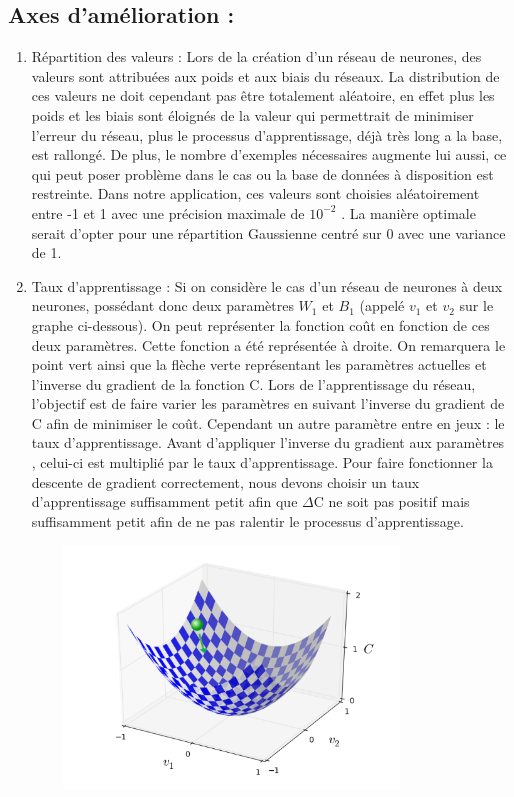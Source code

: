\documentclass{article}
\begin{document}
\subsection{Axes d'amélioration :}
	\begin{enumerate}
			\item Répartition des valeurs :
			Lors de la création d'un réseau de neurones, des valeurs sont attribuées aux poids et aux biais du réseaux. La distribution de ces valeurs ne doit cependant pas être totalement aléatoire, en effet plus les poids et les biais sont éloignés de la valeur qui permettrait de minimiser l'erreur du réseau, plus le processus d'apprentissage, déjà très long a la base, est rallongé. 
De plus, le nombre d'exemples nécessaires augmente lui aussi, ce qui peut poser problème dans le cas ou la base de données à disposition est restreinte. 
Dans notre application, ces valeurs sont choisies aléatoirement entre -1 et 1 avec une précision maximale de $10^{-2}$ . La manière optimale serait d'opter pour une répartition Gaussienne centré sur 0 avec une variance de 1.
			\item Taux d'apprentissage :
			Si on considère le cas d'un réseau de neurones à deux neurones, possédant donc deux paramètres
$W_1$ et $B_1$ (appelé $v_1$ et $v_2$ sur le graphe ci-dessous). On peut représenter la fonction coût en fonction de ces
deux paramètres. Cette fonction a été représentée à droite. On remarquera le point vert ainsi que la flèche verte représentant les paramètres actuelles et l'inverse du gradient de la fonction C.
Lors de l'apprentissage du réseau, l'objectif est de faire varier les paramètres en suivant l'inverse du gradient de C afin de minimiser le coût.
Cependant un autre paramètre entre en jeux : le taux d'apprentissage. Avant d'appliquer l'inverse du gradient aux paramètres , celui-ci est multiplié par le taux  d'apprentissage. 
Pour faire fonctionner la descente de gradient correctement, nous devons choisir un taux d'apprentissage suffisamment petit afin que $\Delta$C ne soit pas positif mais suffisamment petit afin de ne pas ralentir le processus d'apprentissage.
				\begin{center} 
				\includegraphics[height=244, width=400]{graphe.PNG}

\end{center}
\end{enumerate}
\end{document}
